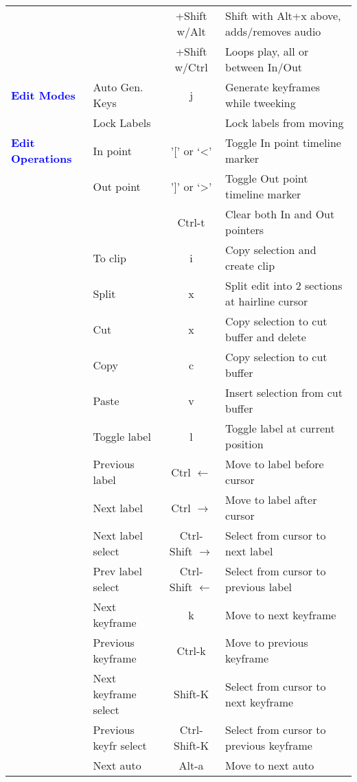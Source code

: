 \begin{center}
\begin{longtable}{ >{\bfseries}p{2cm} l c p{6cm}}
        &  & +Shift w/Alt & Shift with Alt+x above, adds/removes audio \\        
        &  & +Shift w/Ctrl & Loops play, all or between In/Out \\
        \midrule
        \textcolor{blue}{Edit Modes} & Auto Gen. Keys & j & Generate keyframes while tweeking \\        
        & Lock Labels &  & Lock labels from moving \\
        \midrule
        \textcolor{blue}{Edit Operations} & In point & '[' or ‘<’ & Toggle In point timeline marker \\        
        & Out point & ']' or ‘>’ & Toggle Out point timeline marker \\        
        &  & Ctrl-t & Clear both In and Out pointers \\        
        & To clip & i & Copy selection and create clip \\        
        & Split & x & Split edit into 2 sections at hairline cursor \\        
        & Cut & x & Copy selection to cut buffer and delete \\        
        & Copy & c & Copy selection to cut buffer \\        
        & Paste & v & Insert selection from cut buffer \\        
        & Toggle label & l & Toggle label at current position \\        
        & Previous label & Ctrl $\leftarrow$ & Move to label before cursor \\        
        & Next label & Ctrl $\rightarrow$ & Move to label after cursor \\        
        & Next label select & Ctrl-Shift $\rightarrow$ & Select from cursor to next label \\        
        & Prev label select & Ctrl-Shift $\leftarrow$ & Select from cursor to previous label \\        
        & Next keyframe & k & Move to next keyframe \\        
        & Previous keyframe & Ctrl-k & Move to previous keyframe \\        
        & Next keyframe select & Shift-K & Select from cursor to next keyframe \\        
        & Previous keyfr select & Ctrl-Shift-K & Select from cursor to previous keyframe \\        
        & Next auto& Alt-a & Move to next auto \\        

\end{longtable}
\end{center}
